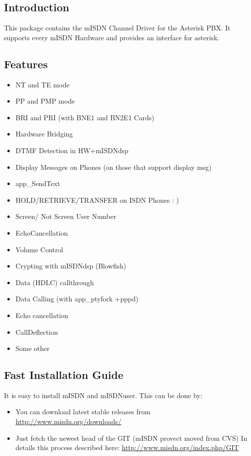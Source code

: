 \subsection{Introduction}

This package contains the mISDN Channel Driver for the Asterisk PBX. It 
supports every mISDN Hardware and provides an interface for asterisk. 

\subsection{Features}

\begin{itemize}
\item  NT and TE mode
\item  PP and PMP mode
\item  BRI and PRI (with BNE1 and BN2E1 Cards)
\item  Hardware Bridging
\item  DTMF Detection in HW+mISDNdsp 
\item  Display Messages on Phones (on those that support display msg)
\item  app\_SendText
\item  HOLD/RETRIEVE/TRANSFER on ISDN Phones : )
\item  Screen/ Not Screen User Number
\item  EchoCancellation 
\item  Volume Control 
\item  Crypting with mISDNdsp (Blowfish)
\item  Data (HDLC) callthrough 
\item  Data Calling (with app\_ptyfork +pppd)
\item  Echo cancellation
\item  CallDeflection
\item Some other
\end{itemize}

\subsection{Fast Installation Guide}

It is easy to install mISDN and mISDNuser. This can be done by:
\begin{itemize} 
     \item You can download latest stable releases from \url{http://www.misdn.org/downloads/}

     \item Just fetch the newest head of the GIT (mISDN provect moved from CVS) 
     In details this process described here: \url{http://www.misdn.org/index.php/GIT}
\end{itemize}


